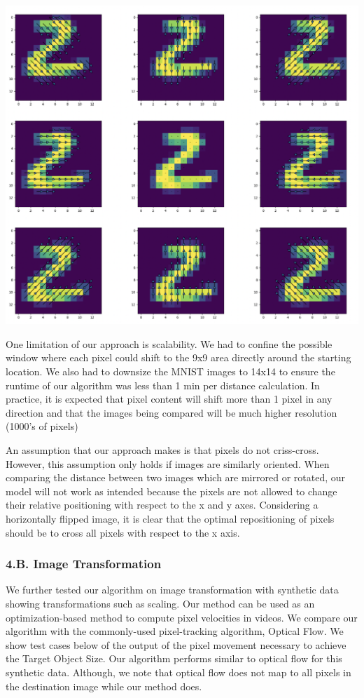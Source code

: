 \documentclass[11pt]{article}
\begin{document}
\includegraphics{example_2_shift.png}

One limitation of our approach is scalability. We had to confine the
possible window where each pixel could shift to the 9x9 area directly
around the starting location. We also had to downsize the MNIST images
to 14x14 to ensure the runtime of our algorithm was less than 1 min per
distance calculation. In practice, it is expected that pixel content
will shift more than 1 pixel in any direction and that the images being
compared will be much higher resolution (1000's of pixels)

An assumption that our approach makes is that pixels do not criss-cross.
However, this assumption only holds if images are similarly oriented.
When comparing the distance between two images which are mirrored or
rotated, our model will not work as intended because the pixels are not
allowed to change their relative positioning with respect to the x and y
axes. Considering a horizontally flipped image, it is clear that the
optimal repositioning of pixels should be to cross all pixels with
respect to the x axis.

    \hypertarget{b.-image-transformation}{%
\subsubsection{4.B. Image
Transformation}\label{b.-image-transformation}}

    We further tested our algorithm on image transformation with synthetic
data showing transformations such as scaling. Our method can be used as
an optimization-based method to compute pixel velocities in videos. We
compare our algorithm with the commonly-used pixel-tracking algorithm,
Optical Flow. We show test cases below of the output of the pixel
movement necessary to achieve the Target Object Size. Our algorithm
performs similar to optical flow for this synthetic data. Although, we
note that optical flow does not map to all pixels in the destination
image while our method does.
\end{document}
